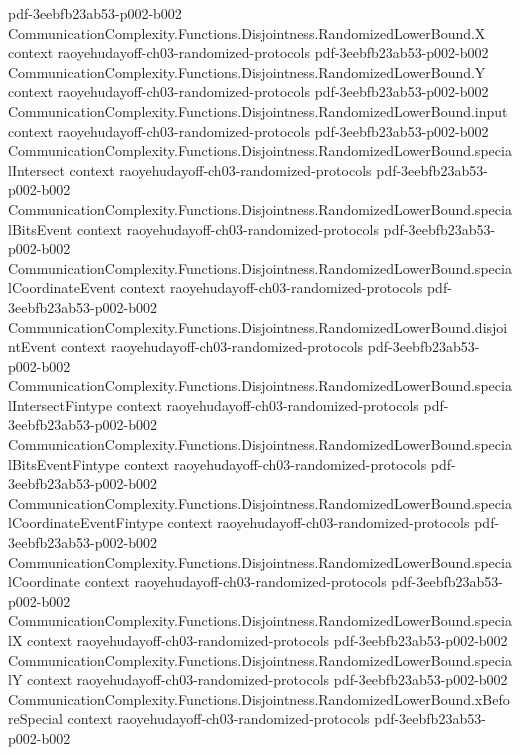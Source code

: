 \begin{theorem}
  {pdf-3eebfb23ab53-p002-b002}
\proofstep
  {CommunicationComplexity.Functions.Disjointness.RandomizedLowerBound.X}
  {context}
  {raoyehudayoff-ch03-randomized-protocols}
  {pdf-3eebfb23ab53-p002-b002}
\proofstep
  {CommunicationComplexity.Functions.Disjointness.RandomizedLowerBound.Y}
  {context}
  {raoyehudayoff-ch03-randomized-protocols}
  {pdf-3eebfb23ab53-p002-b002}
\proofstep
  {CommunicationComplexity.Functions.Disjointness.RandomizedLowerBound.input}
  {context}
  {raoyehudayoff-ch03-randomized-protocols}
  {pdf-3eebfb23ab53-p002-b002}
\proofstep
  {CommunicationComplexity.Functions.Disjointness.RandomizedLowerBound.specialIntersect}
  {context}
  {raoyehudayoff-ch03-randomized-protocols}
  {pdf-3eebfb23ab53-p002-b002}
\proofstep
  {CommunicationComplexity.Functions.Disjointness.RandomizedLowerBound.specialBitsEvent}
  {context}
  {raoyehudayoff-ch03-randomized-protocols}
  {pdf-3eebfb23ab53-p002-b002}
\proofstep
  {CommunicationComplexity.Functions.Disjointness.RandomizedLowerBound.specialCoordinateEvent}
  {context}
  {raoyehudayoff-ch03-randomized-protocols}
  {pdf-3eebfb23ab53-p002-b002}
\proofstep
  {CommunicationComplexity.Functions.Disjointness.RandomizedLowerBound.disjointEvent}
  {context}
  {raoyehudayoff-ch03-randomized-protocols}
  {pdf-3eebfb23ab53-p002-b002}
\proofstep
  {CommunicationComplexity.Functions.Disjointness.RandomizedLowerBound.specialIntersectFintype}
  {context}
  {raoyehudayoff-ch03-randomized-protocols}
  {pdf-3eebfb23ab53-p002-b002}
\proofstep
  {CommunicationComplexity.Functions.Disjointness.RandomizedLowerBound.specialBitsEventFintype}
  {context}
  {raoyehudayoff-ch03-randomized-protocols}
  {pdf-3eebfb23ab53-p002-b002}
\proofstep
  {CommunicationComplexity.Functions.Disjointness.RandomizedLowerBound.specialCoordinateEventFintype}
  {context}
  {raoyehudayoff-ch03-randomized-protocols}
  {pdf-3eebfb23ab53-p002-b002}
\proofstep
  {CommunicationComplexity.Functions.Disjointness.RandomizedLowerBound.specialCoordinate}
  {context}
  {raoyehudayoff-ch03-randomized-protocols}
  {pdf-3eebfb23ab53-p002-b002}
\proofstep
  {CommunicationComplexity.Functions.Disjointness.RandomizedLowerBound.specialX}
  {context}
  {raoyehudayoff-ch03-randomized-protocols}
  {pdf-3eebfb23ab53-p002-b002}
\proofstep
  {CommunicationComplexity.Functions.Disjointness.RandomizedLowerBound.specialY}
  {context}
  {raoyehudayoff-ch03-randomized-protocols}
  {pdf-3eebfb23ab53-p002-b002}
\proofstep
  {CommunicationComplexity.Functions.Disjointness.RandomizedLowerBound.xBeforeSpecial}
  {context}
  {raoyehudayoff-ch03-randomized-protocols}
  {pdf-3eebfb23ab53-p002-b002}

\end{theorem}

